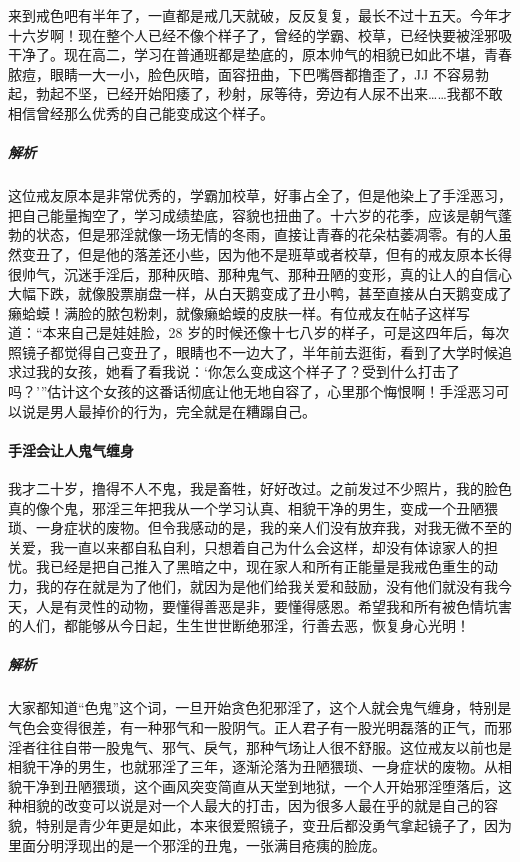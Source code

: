 \begin{case}
    来到戒色吧有半年了，一直都是戒几天就破，反反复复，最长不过十五天。今年才十六岁啊！现在整个人已经不像个样子了，曾经的学霸、校草，已经快要被淫邪吸干净了。现在高二，学习在普通班都是垫底的，原本帅气的相貌已如此不堪，青春脓痘，眼睛一大一小，脸色灰暗，面容扭曲，下巴嘴唇都撸歪了，JJ 不容易勃起，勃起不坚，已经开始阳痿了，秒射，尿等待，旁边有人尿不出来……我都不敢相信曾经那么优秀的自己能变成这个样子。
    \subparagraph{解析} 这位戒友原本是非常优秀的，学霸加校草，好事占全了，但是他染上了手淫恶习，把自己能量掏空了，学习成绩垫底，容貌也扭曲了。十六岁的花季，应该是朝气蓬勃的状态，但是邪淫就像一场无情的冬雨，直接让青春的花朵枯萎凋零。有的人虽然变丑了，但是他的落差还小些，因为他不是班草或者校草，但有的戒友原本长得很帅气，沉迷手淫后，那种灰暗、那种鬼气、那种丑陋的变形，真的让人的自信心大幅下跌，就像股票崩盘一样，从白天鹅变成了丑小鸭，甚至直接从白天鹅变成了癞蛤蟆！满脸的脓包粉刺，就像癞蛤蟆的皮肤一样。有位戒友在帖子这样写道：“本来自己是娃娃脸，28 岁的时候还像十七八岁的样子，可是这四年后，每次照镜子都觉得自己变丑了，眼睛也不一边大了，半年前去逛街，看到了大学时候追求过我的女孩，她看了看我说：‘你怎么变成这个样子了？受到什么打击了吗？’”估计这个女孩的这番话彻底让他无地自容了，心里那个悔恨啊！手淫恶习可以说是男人最掉价的行为，完全就是在糟蹋自己。
\end{case}

\paragraph{手淫会让人鬼气缠身}

\begin{case}
    我才二十岁，撸得不人不鬼，我是畜牲，好好改过。之前发过不少照片，我的脸色真的像个鬼，邪淫三年把我从一个学习认真、相貌干净的男生，变成一个丑陋猥琐、一身症状的废物。但令我感动的是，我的亲人们没有放弃我，对我无微不至的关爱，我一直以来都自私自利，只想着自己为什么会这样，却没有体谅家人的担忧。我已经是把自己推入了黑暗之中，现在家人和所有正能量是我戒色重生的动力，我的存在就是为了他们，就因为是他们给我关爱和鼓励，没有他们就没有我今天，人是有灵性的动物，要懂得善恶是非，要懂得感恩。希望我和所有被色情坑害的人们，都能够从今日起，生生世世断绝邪淫，行善去恶，恢复身心光明！
    \subparagraph{解析} 大家都知道“色鬼”这个词，一旦开始贪色犯邪淫了，这个人就会鬼气缠身，特别是气色会变得很差，有一种邪气和一股阴气。正人君子有一股光明磊落的正气，而邪淫者往往自带一股鬼气、邪气、戾气，那种气场让人很不舒服。这位戒友以前也是相貌干净的男生，也就邪淫了三年，逐渐沦落为丑陋猥琐、一身症状的废物。从相貌干净到丑陋猥琐，这个画风突变简直从天堂到地狱，一个人开始邪淫堕落后，这种相貌的改变可以说是对一个人最大的打击，因为很多人最在乎的就是自己的容貌，特别是青少年更是如此，本来很爱照镜子，变丑后都没勇气拿起镜子了，因为里面分明浮现出的是一个邪淫的丑鬼，一张满目疮痍的脸庞。
\end{case}

